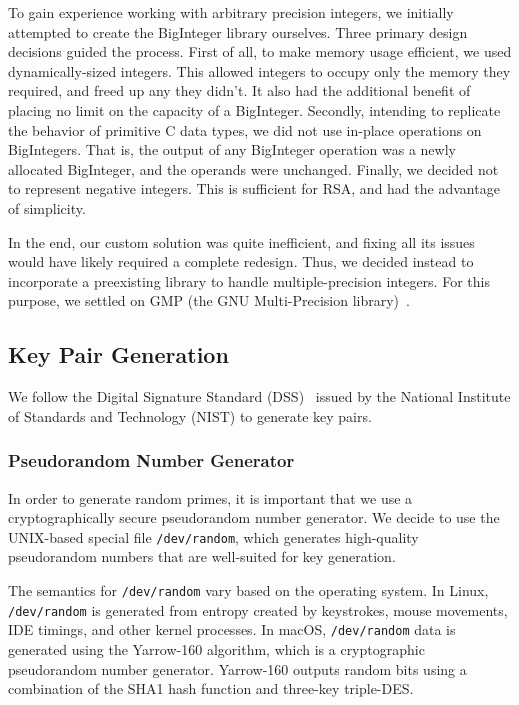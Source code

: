 \documentclass[a4paper]{article}
\begin{document}
To gain experience working with arbitrary precision integers, we initially attempted to create the BigInteger library ourselves. Three primary design decisions guided the process. First of all, to make memory usage efficient, we used dynamically-sized integers. This allowed integers to occupy only the memory they required, and freed up any they didn't. It also had the additional benefit of placing no limit on the capacity of a BigInteger. Secondly, intending to replicate the behavior of primitive C data types, we did not use in-place operations on BigIntegers. That is, the output of any BigInteger operation was a newly allocated BigInteger, and the operands were unchanged. Finally, we decided not to represent negative integers. This is sufficient for RSA, and had the advantage of simplicity.

In the end, our custom solution was quite inefficient, and fixing all its issues would have likely required a complete redesign. Thus, we decided instead to incorporate a preexisting library to handle multiple-precision integers. For this purpose, we settled on GMP (the GNU Multi-Precision library)~\cite{gmpmultiple}.

\subsection{Key Pair Generation}

We follow the Digital Signature Standard (DSS)~\cite{fips2013186} issued by the National Institute of Standards and Technology (NIST) to generate key pairs.

\subsubsection{Pseudorandom Number Generator}\label{sec:prng}
In order to generate random primes, it is important that we use a cryptographically secure pseudorandom number generator. We decide to use the UNIX-based special file {\tt /dev/random}, which generates high-quality pseudorandom numbers that are well-suited for key generation.

The semantics for {\tt /dev/random} vary based on the operating system. In Linux,  {\tt /dev/random} is generated from entropy created by keystrokes, mouse movements, IDE timings, and other kernel processes. In macOS, {\tt /dev/random} data is generated using the Yarrow-160 algorithm, which is a cryptographic pseudorandom number generator. Yarrow-160 outputs random bits using a combination of the SHA1 hash function and three-key triple-DES.
\end{document}
